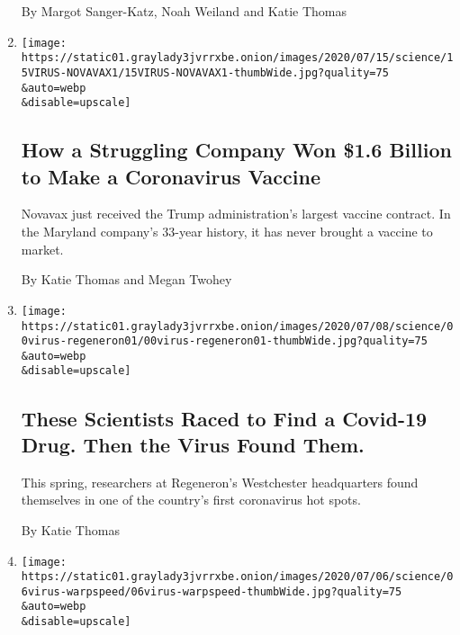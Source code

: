 \begin{enumerate}
  By Margot Sanger-Katz, Noah Weiland and Katie Thomas
\item
  \href{/2020/07/16/health/coronavirus-vaccine-novavax.html}{}

  \texttt{[image: https://static01.graylady3jvrrxbe.onion/images/2020/07/15/science/15VIRUS-NOVAVAX1/15VIRUS-NOVAVAX1-thumbWide.jpg?quality=75\\\&auto=webp\\\&disable=upscale]}

  \hypertarget{how-a-struggling-company-won-16-billion-to-make-a-coronavirus-vaccine}{%
  \subsection{How a Struggling Company Won \$1.6 Billion to Make a
  Coronavirus
  Vaccine}\label{how-a-struggling-company-won-16-billion-to-make-a-coronavirus-vaccine}}

  Novavax just received the Trump administration's largest vaccine
  contract. In the Maryland company's 33-year history, it has never
  brought a vaccine to market.

  By Katie Thomas and Megan Twohey
\item
  \href{/2020/07/09/health/regeneron-monoclonal-antibodies.html}{}

  \texttt{[image: https://static01.graylady3jvrrxbe.onion/images/2020/07/08/science/00virus-regeneron01/00virus-regeneron01-thumbWide.jpg?quality=75\\\&auto=webp\\\&disable=upscale]}

  \hypertarget{these-scientists-raced-to-find-a-covid-19-drug-then-the-virus-found-them}{%
  \subsection{These Scientists Raced to Find a Covid-19 Drug. Then the
  Virus Found
  Them.}\label{these-scientists-raced-to-find-a-covid-19-drug-then-the-virus-found-them}}

  This spring, researchers at Regeneron's Westchester headquarters found
  themselves in one of the country's first coronavirus hot spots.

  By Katie Thomas
\item
  \href{/2020/07/07/health/novavax-coronavirus-vaccine-warp-speed.html}{}

  \texttt{[image: https://static01.graylady3jvrrxbe.onion/images/2020/07/06/science/06virus-warpspeed/06virus-warpspeed-thumbWide.jpg?quality=75\\\&auto=webp\\\&disable=upscale]}

  \hypertarget{us-will-pay-16-billion-to-novavax-for-coronavirus-vaccine}{%
}
\end{enumerate}
